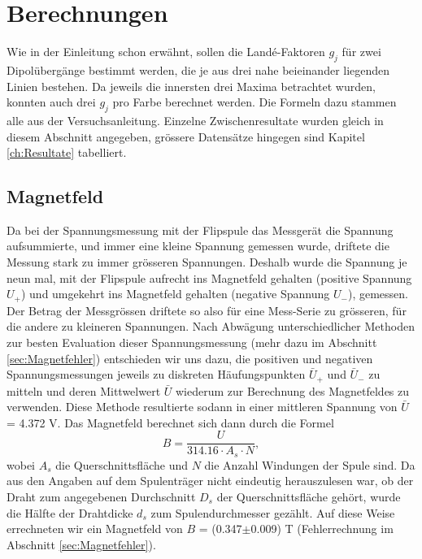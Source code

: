 \documentclass[a4paper,parskip,11pt, DIV12]{scrreprt}
\begin{document}
	
	\chapter{Berechnungen}
	\label{ch:Berechnungen}
	
	Wie in der Einleitung schon erwähnt, sollen die Landé-Faktoren $g_j$ für zwei Dipolübergänge bestimmt werden, die je aus drei nahe beieinander liegenden Linien bestehen. Da jeweils die innersten drei Maxima betrachtet wurden, konnten auch drei $g_j$ pro Farbe berechnet werden. Die Formeln dazu stammen alle aus der Versuchsanleitung. Einzelne Zwischenresultate wurden gleich in diesem Abschnitt angegeben, grössere Datensätze hingegen sind Kapitel \ref{ch:Resultate} tabelliert.
	
	\section{Magnetfeld}
	
	Da bei der Spannungsmessung mit der Flipspule das Messgerät die Spannung aufsummierte, und immer eine kleine Spannung gemessen wurde, driftete die Messung stark zu immer grösseren Spannungen. Deshalb wurde die Spannung je neun mal, mit der Flipspule aufrecht ins Magnetfeld gehalten (positive Spannung $U_+$) und umgekehrt ins Magnetfeld gehalten (negative Spannung $U_-$), gemessen. Der Betrag der Messgrössen driftete so also für eine Mess-Serie zu grösseren, für die andere zu kleineren Spannungen. Nach Abwägung unterschiedlicher Methoden zur besten Evaluation dieser Spannungsmessung (mehr dazu im Abschnitt \ref{sec:Magnetfehler}) entschieden wir uns dazu, die positiven und negativen Spannungsmessungen jeweils zu diskreten Häufungspunkten $\bar{U}_+$ und $\bar{U}_-$ zu mitteln und deren Mittwelwert $\bar{U}$ wiederum zur Berechnung des Magnetfeldes zu verwenden. Diese Methode resultierte sodann in einer mittleren Spannung von $\bar{U}$ = 4.372 V.
	Das Magnetfeld berechnet sich dann durch die Formel
	\begin{equation}
	\label{B-Feld}
	B = \frac{U}{314.16 \cdot A_s \cdot N} ,
	\end{equation}
	wobei $A_s$ die Querschnittsfläche und $N$ die Anzahl Windungen der Spule sind. Da aus den Angaben auf dem Spulenträger nicht eindeutig herauszulesen war, ob der Draht zum angegebenen Durchschnitt $D_s$ der Querschnittsfläche gehört, wurde die Hälfte der Drahtdicke $d_s$ zum Spulendurchmesser gezählt. Auf diese Weise errechneten wir ein Magnetfeld von $B$ = (0.347$\pm$0.009) T (Fehlerrechnung im Abschnitt \ref{sec:Magnetfehler}).
	
\end{document}
